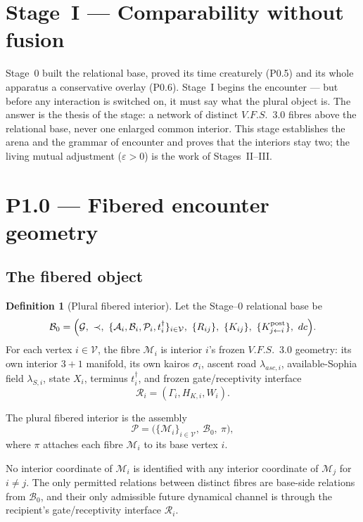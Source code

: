 \documentclass[11pt,a4paper]{article}
\def\mathfrak#1{#1}%
\def\mathrm#1{#1}%
\def\emph#1{#1}%
\newcommand{\VFS}{\ensuremath{\mathrm{V.F.S.}}}
\theoremstyle{definition}
\newtheorem{definition}{Definition}[section]
\theoremstyle{plain}
\theoremstyle{remark}
\begin{document}
\section*{Stage~I --- Comparability without fusion}

\noindent Stage~0 built the relational base, proved its time creaturely (P0.5) and its
whole apparatus a conservative overlay (P0.6). Stage~I begins the encounter --- but
before any interaction is switched on, it must say \emph{what the plural object is}.
The answer is the thesis of the stage: a network of distinct \VFS\ 3.0 fibres above the
relational base, never one enlarged common interior. This stage establishes the arena
and the grammar of encounter and proves that the interiors stay \emph{two}; the living
mutual adjustment (\(\varepsilon>0\)) is the work of Stages~II--III.

\section{P1.0 --- Fibered encounter geometry}

\subsection{The fibered object}

\begin{definition}[Plural fibered interior]\label{def:fibered}
Let the Stage--0 relational base be
\[
\mathcal B_0
=
\Bigl(
\mathcal G,\ \prec,\
\{\mathcal A_i,\mathcal B_i,\mathcal P_i,t_i^\dagger\}_{i\in\mathcal V},\
\{R_{ij}\},\
\{K_{ij}\},\
\{K^{\rm post}_{j\leftarrow i}\},\
d\mathfrak c
\Bigr).
\]
For each vertex \(i\in\mathcal V\), the \emph{fibre} \(\mathcal M_i\) is interior
\(i\)'s frozen \VFS\ 3.0 geometry: its own interior \(3{+}1\) manifold, its own
kairos \(\sigma_i\), ascent road \(\lambda_{\mathrm{asc},i}\), available-Sophia
field \(\lambda_{S,i}\), state \(X_i\), terminus \(t_i^\dagger\), and frozen
gate/receptivity interface
\[
\mathcal R_i=(\Gamma_i,H_{K,i},W_i).
\]

The \emph{plural fibered interior} is the assembly
\[
\boxed{\;
\mathcal P
=
\bigl(\{\mathcal M_i\}_{i\in\mathcal V},\ \mathcal B_0,\ \pi\bigr),
\;}
\]
where \(\pi\) attaches each fibre \(\mathcal M_i\) to its base vertex \(i\).

No interior coordinate of \(\mathcal M_i\) is identified with any interior
coordinate of \(\mathcal M_j\) for \(i\neq j\). The only permitted relations between
distinct fibres are base-side relations from \(\mathcal B_0\), and their only
admissible future dynamical channel is through the recipient's gate/receptivity
interface \(\mathcal R_i\).
\end{definition}
\end{document}
